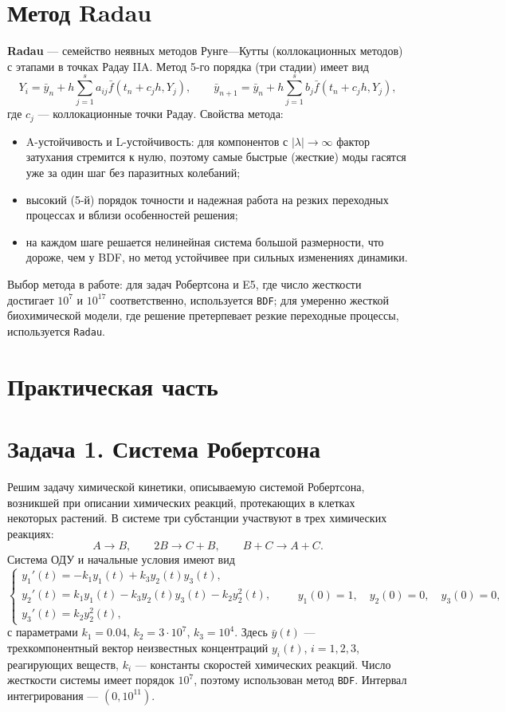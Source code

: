﻿\documentclass[a4paper]{article}
\newcommand{\mainsection}[1]{%
    \phantomsection
    \section*{\centering\fontsize{16pt}{0pt}\selectfont\textbf{#1}}%
}
\newcommand{\subsectiontext}[1]{%
    \section*{\fontsize{13pt}{0pt}\selectfont\textbf{#1}}%
}
\begin{document}
\subsectiontext{Метод Radau}

\textbf{Radau} --- семейство неявных методов Рунге---Кутты (коллокационных методов) с этапами в точках Радау IIA. Метод 5-го порядка (три стадии) имеет вид
\begin{equation*}
    Y_i = \bar{y}_n + h \sum_{j=1}^{s} a_{ij} \bar{f}(t_n + c_j h, Y_j), \qquad
    \bar{y}_{n+1} = \bar{y}_n + h \sum_{j=1}^{s} b_j \bar{f}(t_n + c_j h, Y_j),
\end{equation*}
где $c_j$ --- коллокационные точки Радау. Свойства метода:
\begin{itemize}
    \item A-устойчивость и L-устойчивость: для компонентов с $|\lambda| \to \infty$ фактор затухания стремится к нулю, поэтому самые быстрые (жесткие) моды гасятся уже за один шаг без паразитных колебаний;
    \item высокий (5-й) порядок точности и надежная работа на резких переходных процессах и вблизи особенностей решения;
    \item на каждом шаге решается нелинейная система большой размерности, что дороже, чем у BDF, но метод устойчивее при сильных изменениях динамики.
\end{itemize}

Выбор метода в работе: для задач Робертсона и E5, где число жесткости достигает $10^{7}$ и $10^{17}$ соответственно, используется \texttt{BDF}; для умеренно жесткой биохимической модели, где решение претерпевает резкие переходные процессы, используется \texttt{Radau}.

\newpage

\label{sec:practice}
\mainsection{Практическая часть}

\subsectiontext{Задача 1. Система Робертсона}

Решим задачу химической кинетики, описываемую системой Робертсона, возникшей при описании химических реакций, протекающих в клетках некоторых растений. В системе три субстанции участвуют в трех химических реакциях:
\begin{equation*}
    A \to B, \qquad 2B \to C + B, \qquad B + C \to A + C.
\end{equation*}
Система ОДУ и начальные условия имеют вид
\begin{equation*}
    \begin{cases}
        y_1'(t) = -k_1 y_1(t) + k_3 y_2(t) y_3(t), \\
        y_2'(t) = k_1 y_1(t) - k_3 y_2(t) y_3(t) - k_2 y_2^2(t), \\
        y_3'(t) = k_2 y_2^2(t),
    \end{cases}
    \qquad y_1(0) = 1, \quad y_2(0) = 0, \quad y_3(0) = 0,
\end{equation*}
с параметрами $k_1 = 0.04$, $k_2 = 3 \cdot 10^7$, $k_3 = 10^4$. Здесь $\bar{y}(t)$ --- трехкомпонентный вектор неизвестных концентраций $y_i(t)$, $i = 1, 2, 3$, реагирующих веществ, $k_i$ --- константы скоростей химических реакций. Число жесткости системы имеет порядок $10^7$, поэтому использован метод \texttt{BDF}. Интервал интегрирования --- $(0, 10^{11})$.
\end{document}
